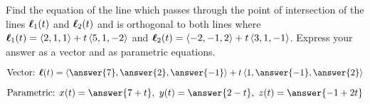 \documentclass{ximera}
\author{Gregory Hartman \and Matthew Carr}
\begin{document}
\begin{exercise}



Find the equation of the line which passes through the point of intersection of the lines $\boldsymbol{\ell}_{1}(t)$ and $\boldsymbol{\ell}_{2}(t)$ and is orthogonal to both lines where $\boldsymbol{\ell}_{1}(t)=\left\langle 2,1,1\right\rangle+t\left\langle 5,1,-2\right\rangle$ and $\boldsymbol{\ell}_{2}(t)=\left\langle -2,-1,2\right\rangle+t\left\langle 3,1,-1\right\rangle$. Express your answer as a vector and as parametric equations.

\begin{prompt}
\[
\text{Vector:  } \vecl(t)=\vector{\answer{7},\answer{2},\answer{-1}}+t\vector{1,\answer{-1},\answer{2}}
\]
\end{prompt}
\begin{prompt}
\[
\text{Parametric:  } x(t)=\answer{7+t},\ y(t)=\answer{2-t},\ z(t)=\answer{-1+2t}
\]
\end{prompt}


\end{exercise}
\end{document}
